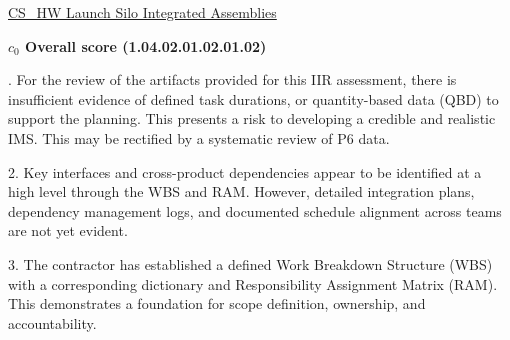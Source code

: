% 


\begin{frame}{\href{run:../local/source-docs/1.04.02.01.02.01.02.pdf}{CS\_HW Launch Silo Integrated Assemblies}}
\centering
{}
\par
\vspace{0.75em}
\textbf{\small{\(c_0\) Overall score {\tiny (1.04.02.01.02.01.02)}}}\\\par
\vspace{0.5em}
\begin{minipage}{0.85\textwidth}
\raggedright
\fontsize{7}{9}. For the review of the artifacts provided for this IIR assessment, there is insufficient evidence of defined task durations, or quantity-based data (QBD) to support the planning. This presents a risk to developing a credible and realistic IMS. This may be rectified by a systematic review of P6 data.\par\vspace{0.5em}2. Key interfaces and cross-product dependencies appear to be identified at a high level through the WBS and RAM. However, detailed integration plans, dependency management logs, and documented schedule alignment across teams are not yet evident.\par\vspace{0.5em}3. The contractor has established a defined Work Breakdown Structure (WBS) with a corresponding dictionary and Responsibility Assignment Matrix (RAM). This demonstrates a foundation for scope definition, ownership, and accountability.\par
\end{minipage}
\end{frame}
